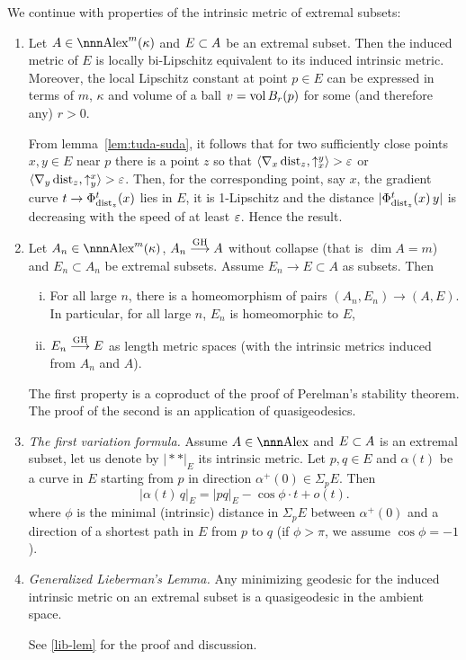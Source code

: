 \documentclass{article}
\begin{document}
\noi We continue with properties of the intrinsic metric of extremal subsets:
\begin{enumerate}
\setcounter{enumi}{\value{extr-prop}}

\item
\cite[3.2(3)]{perelman-petrunin:extremal} Let $A\in\Alex^m(\kappa)$ and $E\subset A$ be an extremal subset. Then the induced 
metric of $E$ is locally bi-Lipschitz equivalent to its induced intrinsic
metric.
Moreover, the local 
Lipschitz constant at point $p\in E$ can be expressed in terms of $m$, $\kappa$
and volume of a ball $v=\operatorname{vol} B_r(p)$ for some (and therefore any) $r>0$.

From lemma~\ref{lem:tuda-suda}, it follows that for two sufficiently close
points $x,y\in E$ near $p$ there is a point $z$ so that
$\langle\nabla_x\operatorname{dist}_z,\uparrow_x^y\rangle >\varepsilon$ or $\langle\nabla_y\operatorname{dist}_z,\uparrow_y^x\rangle
>\varepsilon$. 
Then, for the corresponding point, say $x$, the gradient curve
$t\to\Phi^t_{\operatorname{dist}_z}(x)$ lies in $E$, it is 1-Lipschitz and the distance
$|\Phi^t_{\operatorname{dist}_z}(x)\,y|$ is decreasing with the speed of at least $\varepsilon$. 
Hence the result.

\item 
Let $A_n\in\Alex^m(\kappa)$, $A_n\GHto A$ without collapse (that is $\dim A=m$) and $E_n\subset A_n$ be extremal subsets. 
Assume $E_n\to E\subset A$ as subsets. 
Then 
\begin{enumerate}[(i)]
\item\cite[9.1]{kapovitch:stability} \label{lim-dim-extr} For all large $n$, there is a homeomorphism of pairs $(A_n,E_n)\to(A,E)$. 
In particular, for all large $n$, $E_n$ is homeomorphic to $E$, 
\item\cite[1.2]{petrunin:extremal}\label{lim-intr-extr} $E_n\GHto E$ as length metric spaces (with the
intrinsic metrics induced from $A_n$ and $A$).
\end{enumerate}
The first property is a coproduct of the proof of Perelman's stability theorem.
The proof of the second is an application of quasigeodesics.

\item \cite[1.4]{petrunin:extremal}\label{1st-var}{\it The first variation formula.} Assume $A\in\Alex$ and
$E\subset A$ is an extremal subset, let us denote by $|\!**|_E$ its intrinsic metric. 
Let $p,q \in E$ and $\alpha(t)$ be a curve in $E$ starting from $p$ in direction
$\alpha^+(0)\in \Sigma_p E$.
Then 
$$ |\alpha(t)\,q|_E=|p q|_E-\cos\phi\cdot t + o(t).$$
where $\phi$ is the minimal (intrinsic) distance in $\Sigma_p E$ between
$\alpha^+(0)$ and a direction of a shortest path in $E$ from $p$ to $q$ (if $\phi>\pi$, we assume $\cos\phi=-1$).

\item {\it Generalized Lieberman's Lemma.} Any minimizing geodesic for the
induced intrinsic metric on an extremal subset is a quasigeodesic in the ambient
space.

See \ref{lib-lem} for the proof and discussion.
\setcounter{extr-prop}{\value{enumi}}
\end{enumerate}
\end{document}
